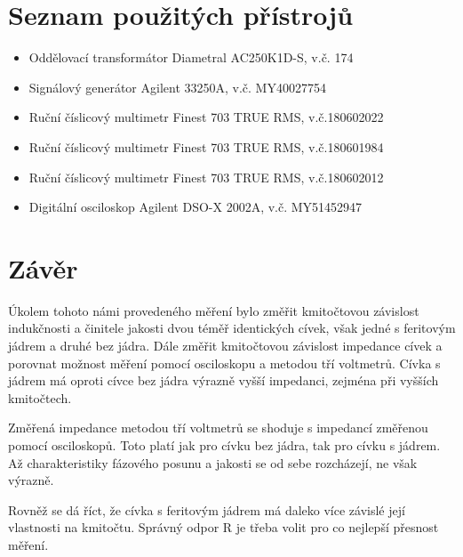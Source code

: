 \documentclass[a4paper, czech]{article}
\begin{document}
\section{Seznam použitých přístrojů}

\begin{itemize}
    \item Oddělovací transformátor Diametral AC250K1D-S, v.č. 174
    \item Signálový generátor Agilent 33250A, v.č. MY40027754
    \item Ruční číslicový multimetr Finest 703 TRUE RMS, v.č.180602022
    \item Ruční číslicový multimetr Finest 703 TRUE RMS, v.č.180601984
    \item Ruční číslicový multimetr Finest 703 TRUE RMS, v.č.180602012
    \item Digitální osciloskop Agilent DSO-X 2002A, v.č. MY51452947
\end{itemize}

\section{Závěr}

Úkolem tohoto námi provedeného měření bylo změřit kmitočtovou závislost indukčnosti a činitele jakosti dvou téměř identických cívek, však jedné s feritovým jádrem a druhé bez jádra. Dále změřit kmitočtovou závislost impedance cívek a porovnat možnost měření pomocí osciloskopu a metodou tří voltmetrů.
Cívka s jádrem má oproti cívce bez jádra výrazně vyšší impedanci, zejména při vyšších kmitočtech.

Změřená impedance metodou tří voltmetrů se shoduje s impedancí změřenou pomocí osciloskopů. Toto platí jak pro cívku bez jádra, tak pro cívku s jádrem. Až charakteristiky fázového posunu a jakosti se od sebe rozcházejí, ne však výrazně.

Rovněž se dá říct, že cívka s feritovým jádrem má daleko více závislé její vlastnosti na kmitočtu.
Správný odpor R je třeba volit pro co nejlepší přesnost měření.
\end{document}
